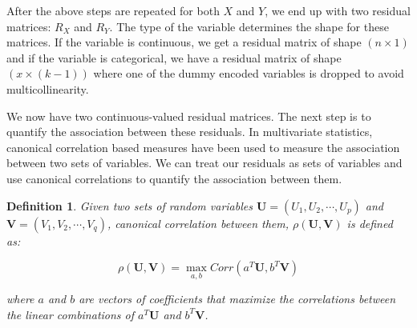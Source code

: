 \documentclass[letterpaper]{article} %
\newtheorem{definition}{Definition}
\begin{document}
After the above steps are repeated for both $ X $ and $ Y $, we end up with two
residual matrices: $ R_X $ and $ R_Y $. The type of the variable determines the
shape for these matrices. If the variable is continuous, we get a residual
matrix of shape $ ( n \times 1 ) $ and if the variable is categorical, we have
a residual matrix of shape $ ( x \times (k -1)) $ where one of the dummy encoded
variables is dropped to avoid multicollinearity.

We now have two continuous-valued residual matrices. The next step is
to quantify the association between these residuals. In multivariate
statistics, canonical correlation based measures have been used to measure
the association between two sets of variables. We can treat our residuals
as sets of variables and use canonical correlations to quantify the association
between them.

\begin{definition} 

	Given two sets of random variables $ \bm{U} = (U_1, U_2, \cdots, U_p) $
	and $ \bm{V} = (V_1, V_2, \cdots, V_q) $, canonical correlation between
	them, $\rho(\bm{U}, \bm{V}) $ is defined as:
		

	\begin{equation}
		\rho(\bm{U}, \bm{V}) = \max_{a, b} Corr(a^T \bm{U}, b^T \bm{V})
	\end{equation}

	where $ a $ and $ b $ are vectors of coefficients that maximize the correlations
	between the linear combinations of $ a^T \bm{U} $ and $ b^T \bm{V} $.
\end{definition}

	
\end{document}
